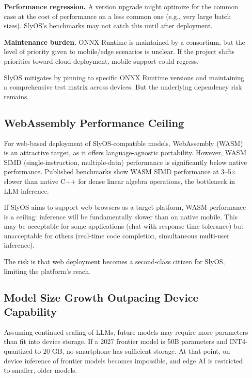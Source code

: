 \documentclass[12pt, letterpaper, twoside]{report}
\begin{document}
\textbf{Performance regression.} A version upgrade might optimize for the common case at the cost of performance on a less common one (e.g., very large batch sizes). SlyOS's benchmarks may not catch this until after deployment.

\textbf{Maintenance burden.} ONNX Runtime is maintained by a consortium, but the level of priority given to mobile/edge scenarios is unclear. If the project shifts priorities toward cloud deployment, mobile support could regress.

SlyOS mitigates by pinning to specific ONNX Runtime versions and maintaining a comprehensive test matrix across devices. But the underlying dependency risk remains.

\subsection{WebAssembly Performance Ceiling}
\label{subsec:wasm_risk}

For web-based deployment of SlyOS-compatible models, WebAssembly (WASM) is an attractive target, as it offers language-agnostic portability. However, WASM SIMD (single-instruction, multiple-data) performance is significantly below native performance. Published benchmarks show WASM SIMD performance at 3--5$\times$ slower than native C++ for dense linear algebra operations, the bottleneck in LLM inference.

If SlyOS aims to support web browsers as a target platform, WASM performance is a ceiling: inference will be fundamentally slower than on native mobile. This may be acceptable for some applications (chat with response time tolerance) but unacceptable for others (real-time code completion, simultaneous multi-user inference).

The risk is that web deployment becomes a second-class citizen for SlyOS, limiting the platform's reach.

\subsection{Model Size Growth Outpacing Device Capability}
\label{subsec:model_growth_risk}

Assuming continued scaling of LLMs, future models may require more parameters than fit into device storage. If a 2027 frontier model is 50B parameters and INT4-quantized to 20 GB, no smartphone has sufficient storage. At that point, on-device inference of frontier models becomes impossible, and edge AI is restricted to smaller, older models.
\end{document}
